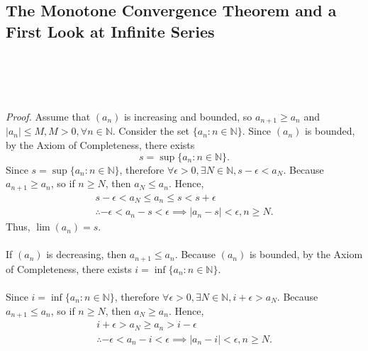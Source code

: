 \documentclass{article}
\begin{document}
            \subsection{The Monotone Convergence Theorem and a First Look at Infinite Series}
                \\ \\
                \\ \\
                \textit{Proof.} Assume that $(a_n)$ is increasing and bounded, so $a_{n+1} \geq a_n$ and $|a_n| \leq M,M>0,\forall n \in \mathbb{N}$. Consider the set $\{a_n:n \in \mathbb{N}\}$. Since $(a_n)$ is bounded, by the Axiom of Completeness, there exists 
                \begin{equation*}
                    s = \sup \{a_n:n \in \mathbb{N}\}.
                \end{equation*}
                Since $s = \sup \{a_n:n \in \mathbb{N}\}$, therefore $\forall \epsilon>0,\exists N \in \mathbb{N}, s-\epsilon< a_N$. Because $a_{n+1} \geq a_n$, so if $n \geq N$, then $a_N \leq a_n$. Hence,
                \begin{gather*}
                    s-\epsilon<a_N\leq a_n \leq s < s+\epsilon\\
                    \therefore -\epsilon<a_n-s<\epsilon \implies |a_n-s|<\epsilon, n \geq N.
                \end{gather*}
                Thus, $\lim (a_n)=s$.\\ \\
                If $(a_n)$ is decreasing, then $a_{n+1}\leq a_n$. Because $(a_n)$ is bounded, by the Axiom of Completeness, there exists $i = \inf \{a_n:n\in \mathbb{N}\}$.\\ \\
                Since $i = \inf \{a_n:n\in \mathbb{N}\}$, therefore $\forall \epsilon>0, \exists N \in \mathbb{N}, i+\epsilon>a_N$. Because $a_{n+1} \leq a_n$, so if $n \geq N$, then $a_N \geq a_n$. Hence,
                \begin{gather*}
                    i+\epsilon > a_N \geq a_n > i-\epsilon \\
                    \therefore -\epsilon < a_n-i < \epsilon \implies |a_n-i| < \epsilon, n \geq N.
                \end{gather*}
\end{document}
